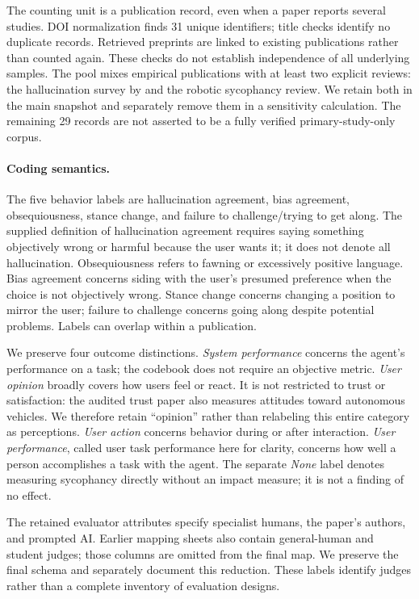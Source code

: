 \documentclass[letterpaper]{article}
\begin{document}
The counting unit is a publication record, even when a paper reports several studies. DOI normalization finds 31 unique identifiers; title checks identify no duplicate records. Retrieved preprints are linked to existing publications rather than counted again. These checks do not establish independence of all underlying samples. The pool mixes empirical publications with at least two explicit reviews: the hallucination survey by \citet{10.1145/3703155} and the robotic sycophancy review. We retain both in the main snapshot and separately remove them in a sensitivity calculation. The remaining 29 records are not asserted to be a fully verified primary-study-only corpus.

\paragraph{Coding semantics.}
The five behavior labels are hallucination agreement, bias agreement, obsequiousness, stance change, and failure to challenge/trying to get along. The supplied definition of hallucination agreement requires saying something objectively wrong or harmful because the user wants it; it does not denote all hallucination. Obsequiousness refers to fawning or excessively positive language. Bias agreement concerns siding with the user's presumed preference when the choice is not objectively wrong. Stance change concerns changing a position to mirror the user; failure to challenge concerns going along despite potential problems. Labels can overlap within a publication.

We preserve four outcome distinctions. \emph{System performance} concerns the agent's performance on a task; the codebook does not require an objective metric. \emph{User opinion} broadly covers how users feel or react. It is not restricted to trust or satisfaction: the audited trust paper also measures attitudes toward autonomous vehicles. We therefore retain ``opinion'' rather than relabeling this entire category as perceptions. \emph{User action} concerns behavior during or after interaction. \emph{User performance}, called user task performance here for clarity, concerns how well a person accomplishes a task with the agent. The separate \emph{None} label denotes measuring sycophancy directly without an impact measure; it is not a finding of no effect.

The retained evaluator attributes specify specialist humans, the paper's authors, and prompted AI. Earlier mapping sheets also contain general-human and student judges; those columns are omitted from the final map. We preserve the final schema and separately document this reduction. These labels identify judges rather than a complete inventory of evaluation designs.
\end{document}
